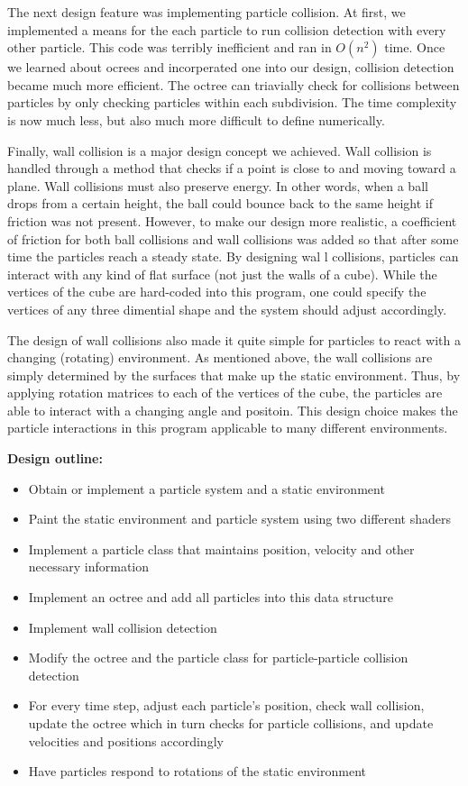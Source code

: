 The next design feature was implementing particle collision. At first, we implemented a means
for the each particle to run collision detection with every other particle. This code was 
terribly inefficient and ran in $O(n^2)$ time. 
Once we learned about ocrees and incorperated one into our design, collision detection 
became much more efficient. The octree can triavially check for collisions between
particles by only checking particles within each subdivision. The time complexity is
now much less, but also much more difficult to define numerically.

Finally, wall collision is a major design concept we achieved. Wall collision is 
handled through a method
that checks if a point is close to and moving toward a plane.  Wall collisions must also
preserve energy. In other words, when a ball drops from a certain height, the ball could
bounce back to the same height if friction was not present. However, to make our design
more realistic, a coefficient of friction for both ball collisions and wall collisions
was added so that after some time the particles reach a steady state.  By designing wal
l collisions, particles can interact with any kind of flat surface
(not just the walls of a cube).  While the vertices of the cube are hard-coded into this
program, one could specify the vertices of any three dimential shape and the system should
adjust accordingly.

The design of wall collisions also made it quite simple for particles to react with a changing
(rotating) environment.  As mentioned above, the wall collisions are simply determined by the
surfaces that make up the static environment.  Thus, by applying rotation matrices to each of
the vertices of the cube, the particles are able to interact with a changing angle and positoin.
This design choice makes the particle interactions in this program applicable to many different environments.  

\textbf{Design outline:}
\begin{itemize}
  \item{Obtain or implement a particle system and a static environment}
  \item{Paint the static environment and particle system using two different shaders}
  \item{Implement a particle class that maintains position, velocity and other necessary information}
  \item{Implement an octree and add all particles into this data structure}
  \item{Implement wall collision detection}
  \item{Modify the octree and the particle class for particle-particle collision detection}
  \item{For every time step, adjust each particle's position, check wall collision, update the octree which in turn checks for particle collisions, and update velocities and positions accordingly}
  \item{Have particles respond to rotations of the static environment}
\end{itemize}
